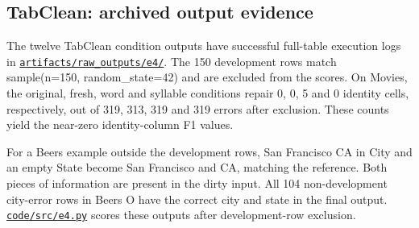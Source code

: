 \documentclass[10pt,a4paper]{article}
\begin{document}
\subsection{TabClean: archived output evidence}

The twelve TabClean condition outputs have successful full-table execution logs in
\href{https://github.com/hinsonver/CoRe-Benchmark/blob/main/artifacts/raw_outputs/e4/}{\nolinkurl{artifacts/raw_outputs/e4/}}.
The 150 development rows match {\ttfamily\small sample(n=150, random\_\allowbreak{}state=42)} and are excluded from the scores. On Movies, the original, fresh, word and syllable conditions repair 0, 0, 5 and 0 identity cells, respectively, out of 319, 313, 319 and 319 errors after exclusion. These counts yield the near-zero identity-column F1 values.

For a Beers example outside the development rows, {\ttfamily\small San Francisco CA} in City and an empty State become {\ttfamily\small San Francisco} and {\ttfamily\small CA}, matching the reference. Both pieces of information are present in the dirty input. All 104 non-development city-error rows in Beers O have the correct city and state in the final output. \href{https://github.com/hinsonver/CoRe-Benchmark/blob/main/code/src/e4.py}{\nolinkurl{code/src/e4.py}} scores these outputs after development-row exclusion.
\end{document}
